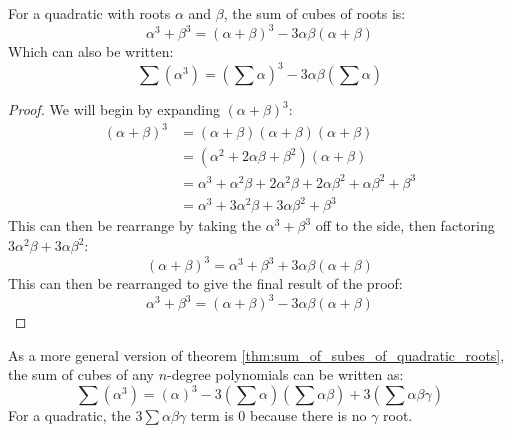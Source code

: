         \begin{theorem} \label{thm:sum_of_subes_of_quadratic_roots}
            For a \gls{quadratic} with \glspl{root} $\alpha$ and $\beta$, the sum of cubes of \glspl{root} is:
            \begin{equation}
                \alpha^3+\beta^3=(\alpha+\beta)^3-3\alpha\beta(\alpha+\beta)
            \end{equation}
            Which can also be written:
            \begin{equation}
                \sum\left(\alpha^3\right)=\left(\sum\alpha\right)^3-3\alpha\beta\left(\sum\alpha\right)
            \end{equation}
        \end{theorem}
        \begin{proof}
            We will begin by expanding $(\alpha+\beta)^3$:
            \begin{equation*}
                \begin{aligned}
                    (\alpha+\beta)^3&=(\alpha+\beta)(\alpha+\beta)(\alpha+\beta) \\
                    &=(\alpha^2+2\alpha\beta+\beta^2)(\alpha+\beta) \\
                    &=\alpha^3+\alpha^2\beta+2\alpha^2\beta+2\alpha\beta^2+\alpha\beta^2+\beta^3 \\
                    &=\alpha^3+3\alpha^2\beta+3\alpha\beta^2+\beta^3
                \end{aligned}
            \end{equation*}
            This can then be rearrange by taking the $\alpha^3+\beta^3$ off to the side, then factoring $3\alpha^2\beta+3\alpha\beta^2$:
            \begin{equation}
                (\alpha+\beta)^3=\alpha^3+\beta^3+3\alpha\beta(\alpha+\beta)
            \end{equation}
            This can then be rearranged to give the final result of the proof:
            \begin{equation}
                \alpha^3+\beta^3=(\alpha+\beta)^3-3\alpha\beta(\alpha+\beta)
            \end{equation}
        \end{proof}

        As a more general version of theorem \ref{thm:sum_of_subes_of_quadratic_roots}, the sum of cubes of any $n$-degree \glspl{polynomial} can be written as:
        \begin{equation}
            \sum\left(\alpha^3\right)=\left(\alpha\right)^3-3\left(\sum\alpha\right)\left(\sum\alpha\beta\right)+3\left(\sum\alpha\beta\gamma\right)
        \end{equation}
        For a \gls{quadratic}, the $3\sum\alpha\beta\gamma$ term is 0 because there is no $\gamma$ \gls{root}.

